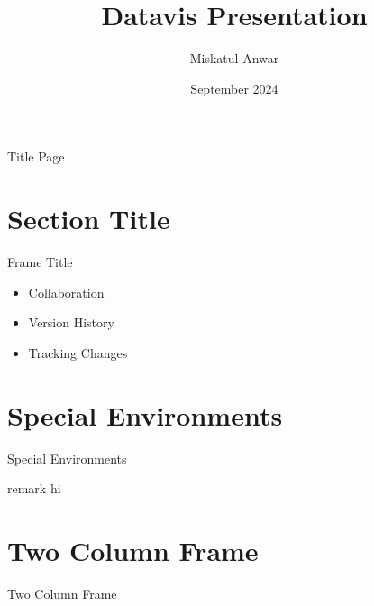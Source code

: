 \documentclass[14pt,aspectratio=169]{beamer}
\title{Datavis Presentation}
\author{Miskatul Anwar}
\date{September 2024}
\begin{document}
\maketitle
\begin{frame}{Title Page}
    \tableofcontents
\end{frame}
\section{Section Title}
\begin{frame}{Frame Title}
    \begin{itemize}
        \item<1-> Collaboration
        \item<2-> Version History
        \item<3-> Tracking Changes
    \end{itemize}
\end{frame}
\section{Special Environments}
\begin{frame}{Special Environments}
    \begin{block}{remark}
        hi
    \end{block}
\end{frame}
\section{Two Column Frame}
\begin{frame}{Two Column Frame}
    \begin{columns}
        \lipsum
        \lipsum
    \end{columns}
\end{frame}
\end{document}
